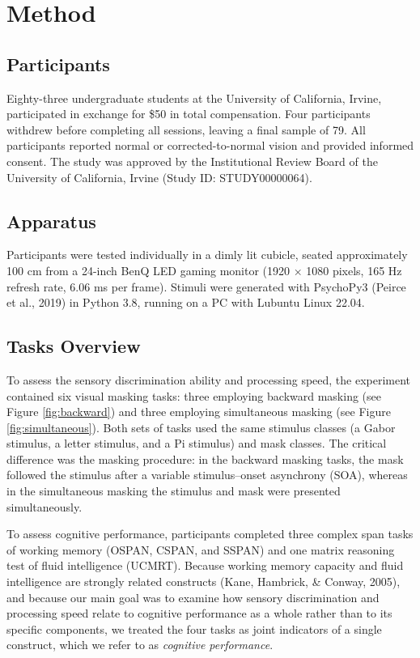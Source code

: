 \documentclass[
  ,man]{apa6}
\begin{document}
\section{Method}\label{method}

\subsection{Participants}\label{participants}

Eighty-three undergraduate students at the University of California, Irvine, participated in exchange for \$50 in total compensation. Four participants withdrew before completing all sessions, leaving a final sample of 79. All participants reported normal or corrected-to-normal vision and provided informed consent. The study was approved by the Institutional Review Board of the University of California, Irvine (Study ID: STUDY00000064).

\subsection{Apparatus}\label{apparatus}

Participants were tested individually in a dimly lit cubicle, seated approximately 100 cm from a 24-inch BenQ LED gaming monitor (1920 × 1080 pixels, 165 Hz refresh rate, 6.06 ms per frame). Stimuli were generated with PsychoPy3 (Peirce et al., 2019) in Python 3.8, running on a PC with Lubuntu Linux 22.04.

\subsection{Tasks Overview}\label{tasks-overview}

To assess the sensory discrimination ability and processing speed, the experiment contained six visual masking tasks: three employing backward masking (see Figure \ref{fig:backward}) and three employing simultaneous masking (see Figure \ref{fig:simultaneous}). Both sets of tasks used the same stimulus classes (a Gabor stimulus, a letter stimulus, and a Pi stimulus) and mask classes. The critical difference was the masking procedure: in the backward masking tasks, the mask followed the stimulus after a variable stimulus--onset asynchrony (SOA), whereas in the simultaneous masking the stimulus and mask were presented simultaneously.

To assess cognitive performance, participants completed three complex span tasks of working memory (OSPAN, CSPAN, and SSPAN) and one matrix reasoning test of fluid intelligence (UCMRT). Because working memory capacity and fluid intelligence are strongly related constructs (Kane, Hambrick, \& Conway, 2005), and because our main goal was to examine how sensory discrimination and processing speed relate to cognitive performance as a whole rather than to its specific components, we treated the four tasks as joint indicators of a single construct, which we refer to as \emph{cognitive performance}.
\end{document}
